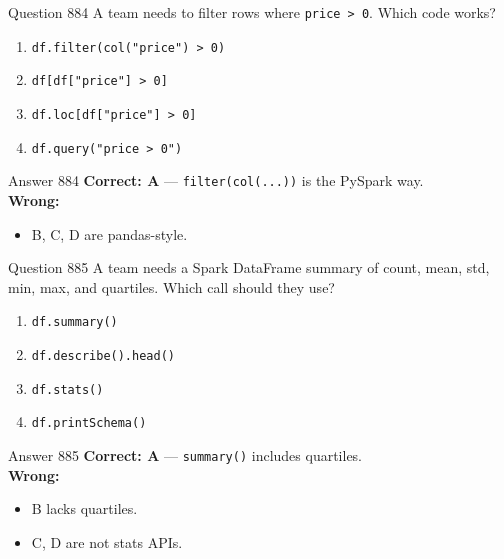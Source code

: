\documentclass[aspectratio=169,11pt]{beamer}
\begin{document}
	\begin{frame}{Question 884}
		A team needs to filter rows where \texttt{price > 0}. Which code works?
		\begin{enumerate}[label=\Alph*.]
			\item \texttt{df.filter(col("price") > 0)}
			\item \texttt{df[df["price"] > 0]}
			\item \texttt{df.loc[df["price"] > 0]}
			\item \texttt{df.query("price > 0")}
		\end{enumerate}
	\end{frame}
	\begin{frame}{Answer 884}
		\textbf{Correct: A} --- \texttt{filter(col(...))} is the PySpark way.\\
		\vspace{0.5em}
		\textbf{Wrong:}
		\begin{itemize}
			\item B, C, D are pandas-style.
		\end{itemize}
	\end{frame}
	
	\begin{frame}{Question 885}
		A team needs a Spark DataFrame summary of count, mean, std, min, max, and quartiles. Which call should they use?
		\begin{enumerate}[label=\Alph*.]
			\item \texttt{df.summary()}
			\item \texttt{df.describe().head()}
			\item \texttt{df.stats()}
			\item \texttt{df.printSchema()}
		\end{enumerate}
	\end{frame}
	\begin{frame}{Answer 885}
		\textbf{Correct: A} --- \texttt{summary()} includes quartiles.\\
		\vspace{0.5em}
		\textbf{Wrong:}
		\begin{itemize}
			\item B lacks quartiles.
			\item C, D are not stats APIs.
		\end{itemize}
	\end{frame}
	
\end{document}
